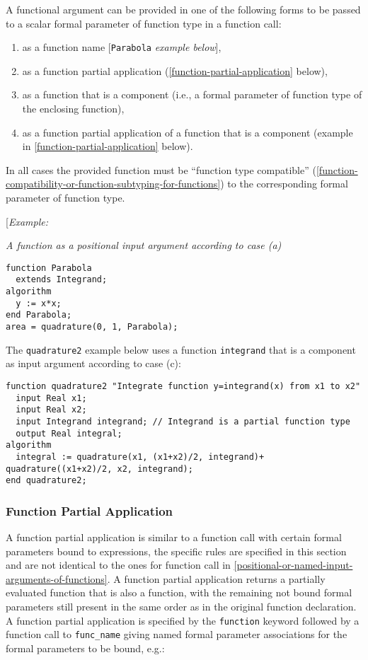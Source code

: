 A functional argument can be provided in one of the following forms to
be passed to a scalar formal parameter of function type in a function
call:

\begin{enumerate}
\def\labelenumi{\alph{enumi})}
\item
  as a function name {[}\lstinline!Parabola! \emph{example below}{]},
\item
  as a function partial application (\autoref{function-partial-application} below),
\item
  as a function that is a component (i.e., a formal parameter of function type of the enclosing function),
\item
  as a function partial application of a function that is a component
  (example in \autoref{function-partial-application} below).
\end{enumerate}

In all cases the provided function must be ``function type compatible''
(\autoref{function-compatibility-or-function-subtyping-for-functions}) to the corresponding formal parameter of function type.

{[}\emph{Example:}

\emph{A function as a positional input argument according to case (a)}

\begin{lstlisting}[language=modelica]
function Parabola
  extends Integrand;
algorithm
  y := x*x;
end Parabola;
area = quadrature(0, 1, Parabola);
\end{lstlisting}
The \lstinline!quadrature2! example below uses a function \lstinline!integrand! that is a
component as input argument according to case (c):

\begin{lstlisting}[language=modelica]
  function quadrature2 "Integrate function y=integrand(x) from x1 to x2"
  input Real x1;
  input Real x2;
  input Integrand integrand; // Integrand is a partial function type
  output Real integral;
algorithm
  integral := quadrature(x1, (x1+x2)/2, integrand)+  quadrature((x1+x2)/2, x2, integrand);
end quadrature2;
\end{lstlisting}
\subsubsection{Function Partial Application}

A function partial application is similar to a function call with
certain formal parameters bound to expressions, the specific rules are
specified in this section and are not identical to the ones for function
call in \autoref{positional-or-named-input-arguments-of-functions}. A function partial application returns a partially
evaluated function that is also a function, with the remaining not bound
formal parameters still present in the same order as in the original
function declaration. A function partial application is specified by the
\lstinline!function! keyword followed by a function call to \lstinline!func_name!
giving named formal parameter associations for the formal parameters to
be bound, e.g.:

